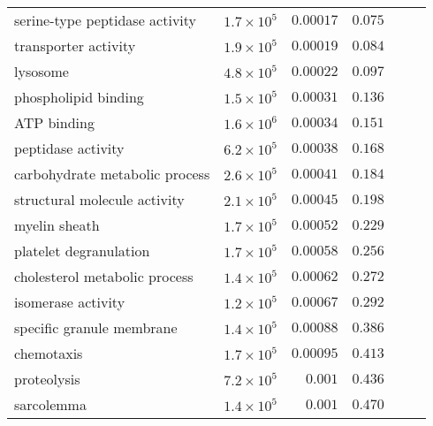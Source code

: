 \begin{longtable}{|l|r|r|r|r|r|}
            serine-type peptidase activity & $1.7\times 10^{5}$ &            $0.00017$ &                     $ 0.075~~$ \\
                      transporter activity & $1.9\times 10^{5}$ &            $0.00019$ &                     $ 0.084~~$ \\
                                  lysosome & $4.8\times 10^{5}$ &            $0.00022$ &                     $ 0.097~~$ \\
                      phospholipid binding & $1.5\times 10^{5}$ &            $0.00031$ &                     $ 0.136~~$ \\
                               ATP binding & $1.6\times 10^{6}$ &            $0.00034$ &                     $ 0.151~~$ \\
                        peptidase activity & $6.2\times 10^{5}$ &            $0.00038$ &                     $ 0.168~~$ \\
            carbohydrate metabolic process & $2.6\times 10^{5}$ &            $0.00041$ &                     $ 0.184~~$ \\
              structural molecule activity & $2.1\times 10^{5}$ &            $0.00045$ &                     $ 0.198~~$ \\
                             myelin sheath & $1.7\times 10^{5}$ &            $0.00052$ &                     $ 0.229~~$ \\
                    platelet degranulation & $1.7\times 10^{5}$ &            $0.00058$ &                     $ 0.256~~$ \\
             cholesterol metabolic process & $1.4\times 10^{5}$ &            $0.00062$ &                     $ 0.272~~$ \\
                        isomerase activity & $1.2\times 10^{5}$ &            $0.00067$ &                     $ 0.292~~$ \\
                 specific granule membrane & $1.4\times 10^{5}$ &            $0.00088$ &                     $ 0.386~~$ \\
                                chemotaxis & $1.7\times 10^{5}$ &            $0.00095$ &                     $ 0.413~~$ \\
                               proteolysis & $7.2\times 10^{5}$ &             $ 0.001$ &                     $ 0.436~~$ \\
                                sarcolemma & $1.4\times 10^{5}$ &             $ 0.001$ &                     $ 0.470~~$ \\

\end{longtable}
